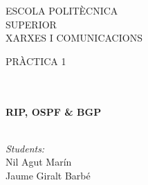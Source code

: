 \documentclass[10pt]{article}
\begin{document}
\begin{center}
\begin{minipage}{0.48\textwidth}
\begin{flushright}
\end{flushright}\end{minipage}

\vspace*{-1.5cm}                                %
\textsc{\huge ESCOLA POLIT\` ECNICA \\ \vspace{5px}SUPERIOR}\\[1.5cm] 

\textsc{\LARGE XARXES I COMUNICACIONS}\\[1.5cm]                                                   %

\begin{minipage}{0.9\textwidth} 
\begin{center}                                                                                  %
\textsc{\LARGE PR\`ACTICA 1}
\end{center}
\end{minipage}\\[0.5cm]
            \vspace*{1cm}                                                                       %
\HRule \\[0.4cm]                                                                    %
{ \huge \bfseries RIP, OSPF \& BGP}\\[0.4cm]  %
\HRule \\[1.5cm]                                                                    %
\begin{minipage}{0.46\textwidth}                                                    %
\begin{flushleft} \large                                                            %
\emph{Students:}\\   
Nil Agut Marín\\
Jaume Giralt Barbé

\end{flushleft}
\end{minipage}
\end{center}
\end{document}
